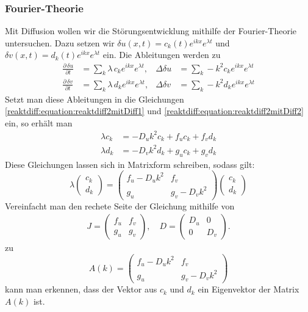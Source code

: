 \subsubsection{Fourier-Theorie}
Mit Diffusion wollen wir die Störungsentwicklung mithilfe der Fourier-Theorie untersuchen.
Dazu setzen wir \(\delta u(x,t) = c_k(t) e^{ikx} e^{\lambda t}\) und \(\delta v(x,t) = d_k(t) e^{ikx} e^{\lambda t}\) ein.
Die Ableitungen werden zu
\begin{align*}
    \frac{\partial\,\delta u}{\partial t} &= \sum_k \lambda\, c_k e^{i k x} e^{\lambda t}, &
    \Delta \delta u &= \sum_k -k^2 c_k e^{i k x} e^{\lambda t} \\
    \frac{\partial\,\delta v}{\partial t} &= \sum_k \lambda\, d_k e^{i k x} e^{\lambda t}, &
    \Delta \delta v &= \sum_k -k^2 d_k e^{i k x} e^{\lambda t}
\end{align*}
Setzt man diese Ableitungen in die Gleichungen \eqref{reaktdiff:equation:reaktdiff2mitDiff1} und \eqref{reaktdiff:equation:reaktdiff2mitDiff2} ein, so erhält man
    \begin{align*}
        \lambda c_k &= -D_u k^2 c_k + f_u c_k + f_v d_k \\
        \lambda d_k &= -D_v k^2 d_k + g_u c_k + g_v d_k
    \end{align*}
Diese Gleichungen lassen sich in Matrixform schreiben, sodass gilt:
\begin{equation*}
    \lambda
    \begin{pmatrix}
    c_k \\
    d_k
    \end{pmatrix}
    =
    \begin{pmatrix}
        f_u - D_u k^2 & f_v \\
        g_u & g_v - D_v k^2
    \end{pmatrix}
    \begin{pmatrix}
    c_k \\
    d_k
    \end{pmatrix}
\end{equation*}
Vereinfacht man den rechete Seite der Gleichung mithilfe von 
\begin{align*}
    J =
    \begin{pmatrix}
        f_u & f_v\\
        g_u & g_v
    \end{pmatrix}, \quad
    D =
    \begin{pmatrix}
        D_u & 0\\
        0 & D_v
    \end{pmatrix}.
\end{align*}
zu 
\begin{equation*}
    A(k) =
    \begin{pmatrix}
        f_u - D_u k^2 & f_v\\
        g_u & g_v - D_v k^2
    \end{pmatrix}
\end{equation*}
kann man erkennen, dass der Vektor aus \(c_k\) und \(d_k\) ein Eigenvektor der Matrix \(A(k)\) ist.

